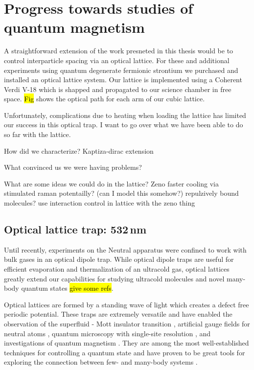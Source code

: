 \chapter{Progress towards studies of quantum magnetism}
\label{ch:chap6}

A straightforward extension of the work presneted in this thesis would be to control interparticle spacing via an optical lattice. For these and additional experiments using quantum degenerate fermionic strontium we purchased and installed an optical lattice system. Our lattice is implemented using a Coherent Verdi V-18 which is shapped and propagated to our science chamber in free space. \hl{Fig} shows the optical path for each arm of our cubic lattice. 

Unfortunately, complications due to heating when loading the lattice has limited our success in this optical trap. I want to go over what we have been able to do so far with the lattice.

How did we characterize?
	Kaptiza-dirac extension
	
What convinced us we were having problems?

What are some ideas we could do in the lattice?
	Zeno
	faster cooling via stimulated raman potentailly? (can I model this somehow?)
	repulzively bound molecules?
	use interaction control in lattice with the zeno thing
	
\section{Optical lattice trap: 532\,nm} \label{ssec:532sys}
Until recently, experiments on the Neutral apparatus were confined to work with bulk gases in an optical dipole trap.
While optical dipole traps are useful for efficient evaporation and thermalization of an ultracold gas, optical lattices greatly extend our capabilities for studying ultracold molecules and novel many-body quantum states \hl{give some refs}.

Optical lattices are formed by a standing wave of light which creates a defect free periodic potential.
These traps are extremely versatile and have enabled the observation of the superfluid - Mott insulator transition \cite{Greiner2002}, artificial gauge fields for neutral atoms \cite{Lin2011}, quantum microscopy with single-site resolution \cite{Bakr2009}, and investigations of quantum magnetism \cite{Hart2015,Greif2015}. 
They are among the most well-established techniques for controlling a quantum state and have proven to be great tools for exploring the connection between few- and many-body systems \cite{Bloch2008}.

